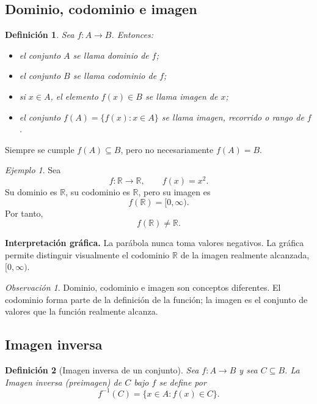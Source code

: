 \documentclass[12pt]{article}
\newtheorem{definicion}{Definición}[section]
\theoremstyle{remark}
\newtheorem{observacion}{Observación}[section]
\newtheorem{ejemplo}{Ejemplo}[section]
\newcommand{\R}{\mathbb{R}}
\begin{document}
\subsection{Dominio, codominio e imagen}
\begin{definicion}
Sea $f:A\to B$. Entonces:

\begin{itemize}
    \item el conjunto $A$ se llama \emph{dominio} de $f$;
    \item el conjunto $B$ se llama \emph{codominio} de $f$;
    \item si $x\in A$, el elemento $f(x)\in B$ se llama \emph{imagen} de $x$;
    \item el conjunto $f(A)=\{f(x):x\in A\}$ se llama \emph{imagen}, \emph{recorrido} o \emph{rango} de $f$.
\end{itemize}
\end{definicion}

Siempre se cumple $f(A)\subseteq B$, pero no necesariamente $f(A)=B$.

\begin{ejemplo}
Sea
\[
f:\R\to\R,\qquad f(x)=x^2.
\]
Su dominio es $\R$, su codominio es $\R$, pero su imagen es
\[
f(\R)=[0,\infty).
\]
Por tanto,
\[
f(\R)\neq\R.
\]

\textbf{Interpretación gráfica.} La parábola nunca toma valores negativos.
La gráfica permite distinguir visualmente el codominio $\R$ de la imagen
realmente alcanzada, $[0,\infty)$.
\begin{center}
\end{center}
\end{ejemplo}

\begin{observacion}
Dominio, codominio e imagen son conceptos diferentes. El codominio forma parte de la definición de la función; la imagen es el conjunto de valores que la función realmente alcanza.
\end{observacion}
\subsection{Imagen inversa}
\begin{definicion}[Imagen inversa de un conjunto]
Sea $f:A\to B$ y sea $C\subseteq B$. La Imagen inversa (preimagen) de $C$ bajo $f$ se define por
\[
f^{-1}(C)=\{x\in A:f(x)\in C\}.
\]
\end{definicion}
\end{document}
